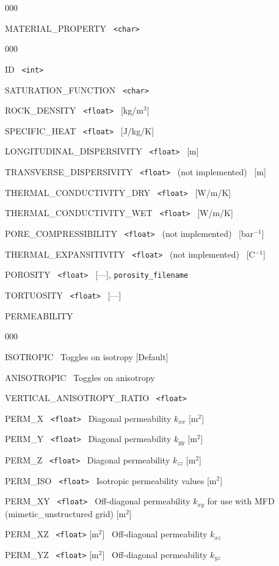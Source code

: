 \begin{deflist}{000}
\item[MATERIAL\_PROPERTY] \ {\tt <char>}
\begin{deflist}{000}
\item[ID] \ {\tt <int>}
\item[SATURATION\_FUNCTION] \ {\tt <char>}
\item[ROCK\_DENSITY] \ {\tt <float>} \ [kg/m$^3$]
\item[SPECIFIC\_HEAT] \ {\tt <float>} \ [J/kg/K]
\item[LONGITUDINAL\_DISPERSIVITY] \ {\tt <float>} \ [m]
\item[TRANSVERSE\_DISPERSIVITY] \ {\tt <float>} \ (not implemented) \ [m]
\item[THERMAL\_CONDUCTIVITY\_DRY] \ {\tt <float>} \ [W/m/K]
\item[THERMAL\_CONDUCTIVITY\_WET] \ {\tt <float>} \ [W/m/K]
\item[PORE\_COMPRESSIBILITY] \ {\tt <float>} \ (not implemented) \ [bar$^{-1}$]
\item[THERMAL\_EXPANSITIVITY] \ {\tt <float>} \ (not implemented) \ [C$^{-1}$]
\item[POROSITY] \ {\tt <float>} \ [---], {\tt porosity\_filename}
\item[TORTUOSITY] \ {\tt <float>} \ [---]
\item[PERMEABILITY] ~
\begin{deflist}{000}
\item[ISOTROPIC] \ Toggles on isotropy [Default]
\item[ANISOTROPIC] \ Toggles on anisotropy
\item[VERTICAL\_ANISOTROPY\_RATIO] \ {\tt <float>}
\item[PERM\_X] \ {\tt <float>} \ Diagonal permeability $k_{xx}$ [m$^2$]
\item[PERM\_Y] \ {\tt <float>} \ Diagonal permeability $k_{yy}$ [m$^2$]
\item[PERM\_Z] \ {\tt <float>} \ Diagonal permeability $k_{zz}$ [m$^2$]
\item[PERM\_ISO] \ {\tt <float>} \ Isotropic permeability values [m$^2$]
\item[PERM\_XY] \ {\tt <float>} \ Off-diagonal permeability $k_{xy}$ for use with MFD (mimetic\_unstructured grid) [m$^2$]
\item[PERM\_XZ] \ {\tt <float>} [m$^2$] \ Off-diagonal permeability $k_{xz}$
\item[PERM\_YZ] \ {\tt <float>} [m$^2$] \ Off-diagonal permeability $k_{yz}$

\end{deflist}
\end{deflist}
\end{deflist}
